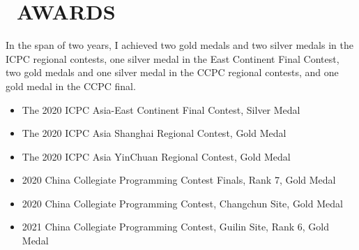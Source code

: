 \section{\faStar\ AWARDS}

In the span of two years, 
I achieved two gold medals and two silver medals in the ICPC regional contests, 
one silver medal in the East Continent Final Contest, 
two gold medals and one silver medal in the CCPC regional contests, 
and one gold medal in the CCPC final.

\begin{itemize}
    \item The 2020 ICPC Asia-East Continent Final Contest, Silver Medal
    \item The 2020 ICPC Asia Shanghai Regional Contest, Gold Medal
    \item The 2020 ICPC Asia YinChuan Regional Contest, Gold Medal
    \item 2020 China Collegiate Programming Contest Finals, Rank 7, Gold Medal
    \item 2020 China Collegiate Programming Contest, Changchun Site, Gold Medal
    \item 2021 China Collegiate Programming Contest, Guilin Site, Rank 6, Gold Medal
\end{itemize}

